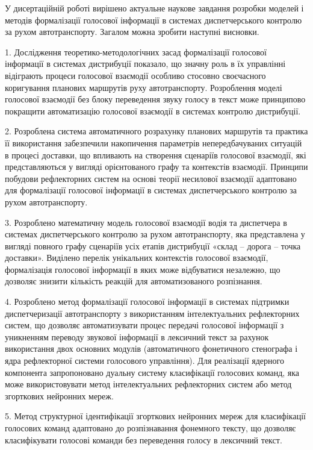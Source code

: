 У дисертаційній роботі вирішено актуальне наукове завдання розробки моделей і методів формалізації голосової інформації в системах диспетчерського контролю за рухом автотранспорту. Загалом можна зробити наступні висновки.

1. Дослідження теоретико-методологічних засад формалізації голосової інформації в системах дистрибуції показало, що значну роль в їх управлінні відіграють процеси голосової взаємодії особливо стосовно своєчасного коригування планових маршрутів руху автотранспорту. Розроблення моделі голосової взаємодії без блоку переведення звуку голосу в текст може принципово покращити автоматизацію голосової взаємодії в системах контролю дистрибуції.

2. Розроблена система автоматичного розрахунку планових маршрутів та практика її використання забезпечили накопичення параметрів непередбачуваних ситуацій в процесі доставки, що впливають на створення сценаріїв голосової взаємодії, які представляються у вигляді орієнтованого графу та контекстів взаємодії. 
Принципи побудови рефлекторних систем на основі теорії несилової взаємодії адаптовано для формалізації голосової інформації в системах диспетчерського контролю за рухом автотранспорту.

3. Розроблено математичну модель голосової взаємодії водія та диспетчера в системах диспетчерського контролю за рухом автотранспорту, яка представлена у вигляді повного графу сценаріїв усіх етапів дистрибуції «склад – дорога – точка доставки». Виділено перелік унікальних контекстів голосової взаємодії, формалізація голосової інформації в яких може відбуватися незалежно, що дозволяє знизити кількість реакцій для автоматизованого розпізнання.

4. Розроблено метод формалізації голосової інформації в системах підтримки диспетчеризації автотранспорту з використанням інтелектуальних рефлекторних систем, що дозволяє автоматизувати процес передачі голосової інформації з уникненням переводу звукової інформації в лексичний текст за рахунок використання двох основних модулів (автоматичного фонетичного стенографа і ядра рефлекторної системи голосового управління). Для реалізації ядерного компонента запропоновано дуальну систему класифікації голосових команд, яка може використовувати метод інтелектуальних рефлекторних систем або метод згорткових нейронних мереж.

5. Метод структурної ідентифікації згорткових нейронних мереж для класифікації голосових команд адаптовано до розпізнавання фонемного тексту, що дозволяє класифікувати голосові команди без переведення голосу в лексичний текст. 

